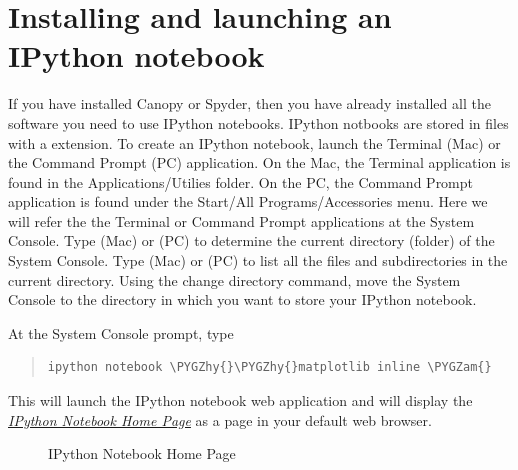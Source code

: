 \documentclass[letterpaper,10pt,english]{sphinxmanual}
\def\PYGZam{\char`\&}
\def\PYGZhy{\char`\-}
\begin{document}
\section{Installing and launching an IPython notebook}
\label{apdx2/apdx2_ipynb:installing-and-launching-an-ipython-notebook}
If you have installed Canopy or Spyder, then you have already installed all the software you need to use IPython notebooks.  IPython notbooks are stored in files with a  extension.  To create an IPython notebook, launch the Terminal (Mac) or the Command Prompt (PC) application.  On the Mac, the Terminal application is found in the Applications/Utilies folder.  On the PC, the Command Prompt application is found under the Start/All Programs/Accessories menu.  Here we will refer the the Terminal or Command Prompt applications at the System Console.  Type  (Mac) or  (PC) to determine the current directory (folder) of the System Console.  Type  (Mac) or  (PC) to list all the files and subdirectories in the current directory.  Using the  change directory command, move the System Console to the directory in which you want to store your IPython notebook.

At the System Console prompt, type
\begin{quote}

\begin{Verbatim}[commandchars=\\\{\}]
ipython notebook \PYGZhy{}\PYGZhy{}matplotlib inline \PYGZam{}
\end{Verbatim}
\end{quote}

This will launch the IPython notebook web application and will display the {\hyperref[apdx2/apdx2_ipynb:fig-nbdashboard]{\emph{IPython Notebook Home Page}}} as a page in your default web browser.
\begin{figure}[htbp]
\centering
\capstart

\caption{IPython Notebook Home Page}\label{apdx2/apdx2_ipynb:fig-nbdashboard}\end{figure}
\end{document}
